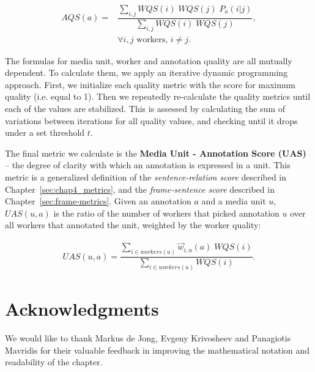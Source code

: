 \begin{align}
AQS(a) = & \dfrac{ \sum\limits_{i,j} WQS(i) \; WQS(j) \; P_a(i | j) }{ \sum\limits_{i,j} WQS(i) \; WQS(j) }, \\
& \forall i, j \text{ workers, }  i \neq j . \nonumber
\end{align}

The formulas for media unit, worker and annotation quality are all mutually dependent. To calculate them, we apply an iterative dynamic programming approach. First, we initialize each quality metric with the score for maximum quality (i.e. equal to 1). Then we repeatedly re-calculate the quality metrics until each of the values are stabilized. This is assessed by calculating the sum of variations between iterations for all quality values, and checking until it drops under a set threshold $t$.

The final metric we calculate is the \textbf{Media Unit - Annotation Score (UAS)} -- the degree of clarity with which an annotation is expressed in a unit. This metric is a generalized definition of the \textit{sentence-relation score} described in Chapter~\ref{sec:chap4_metrics}, and the \textit{frame-sentence score} described in Chapter~\ref{sec:frame-metrics}. Given an annotation $a$ and a media unit $u$, $UAS(u, a)$ is the ratio of the number of workers that picked annotation $u$ over all workers that annotated the unit, weighted by the worker quality:

\begin{align}
UAS(u, a) = \dfrac{ \sum\limits_{i \in workers(u)} \vec{w}_{i,u}(a) \; WQS(i) }{ \sum\limits_{i \in workers(u)} WQS(i) }.
\end{align}


\section*{Acknowledgments}

We would like to thank Markus de Jong, Evgeny Krivosheev and Panagiotis Mavridis for their valuable feedback in improving the mathematical notation and readability of the chapter. 